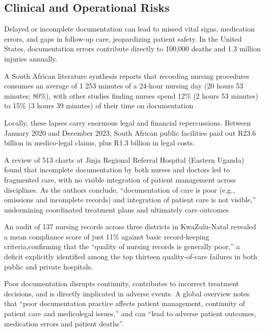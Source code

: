 \documentclass[a4paper,11pt]{article}
\begin{document}
\subsection{Clinical and Operational Risks}

Delayed or incomplete documentation can lead to missed vital signs, medication errors, and gaps in follow-up care, jeopardizing patient safety. In the United States, documentation errors contribute directly to 100,000 deaths and 1.3 million injuries annually.\cite{gilletteSAIVAAIOptimize2022}

A South African literature synthesis reports that recording nursing procedures consumes an average of 1 253 minutes of a 24-hour nursing day (20 hours 53 minutes; 80\%), \cite{cheevakasemsookStudyNursingDocumentation2006} with other studies finding nurses spend 12\% (2 hours 53 minutes) to 15\% (3 hours 39 minutes) of their time on documentation \cite{olivierRecordKeepingSelfreported2010}

Locally, these lapses carry enormous legal and financial repercussions. Between January 2020 and December 2023, South African public facilities paid out R23.6 billion in medico-legal claims, plus R1.3 billion in legal costs. \cite{R236BillionPaid}

A review of 513 charts at Jinja Regional Referral Hospital (Eastern Uganda) found that incomplete documentation by both nurses and doctors led to fragmented care, with no visible integration of patient management across disciplines. As the authors conclude, “documentation of care is poor (e.g., omissions and incomplete records) and integration of patient care is not visible,” undermining coordinated treatment plans and ultimately care outcomes \cite{NursingDocumentationDilemma}

An audit of 137 nursing records across three districts in KwaZulu-Natal revealed a mean compliance score of just 11\% against basic record-keeping criteria,confirming that the “quality of nursing records is generally poor,” a deficit explicitly identified among the top thirteen quality-of-care failures in both public and private hospitals. \cite{olivierRecordKeepingSelfreported2010}

Poor documentation disrupts continuity, contributes to incorrect treatment decisions, and is directly implicated in adverse events. A global overview notes that “poor documentation practice affects patient management, continuity of patient care and medicolegal issues,” and can “lead to adverse patient outcomes, medication errors and patient deaths”. \cite{demsashHealthProfessionalsRoutine2023}
\end{document}
